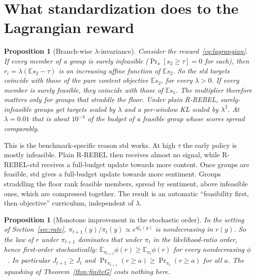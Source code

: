 \documentclass[11pt]{article}
\newtheorem{proposition}[theorem]{Proposition}
\theoremstyle{definition}
\theoremstyle{remark}
\newcommand{\E}{\mathbb{E}}
\newcommand{\1}{\mathbb{1}}
\newcommand{\rr}{R-REBEL}
\newcommand{\rrs}{R-REBEL-std}
\begin{document}
\section{What standardization does to the Lagrangian reward}\label{sec:lagrangian}

\begin{proposition}[Branch-wise $\lambda$-invariance]\label{prop:branch}
Consider the reward~\eqref{eq:lagrangian}. If every member of a group is surely
infeasible ($\Pr_o[s_2\ge\tau]=0$ for each), then $r_i=\lambda(\E s_2-\tau)$ is an
increasing affine function of $\E s_2$. So the std targets coincide with those of
the pure content objective $\E s_2$, for every $\lambda>0$. If every member is surely
feasible, they coincide with those of $\E s_1$. The multiplier therefore matters only
for groups that straddle the floor. Under plain \rr{}, surely-infeasible groups get
targets scaled by $\lambda$ and a per-window KL scaled by $\lambda^2$. At $\lambda=0.01$ that is
about $10^{-4}$ of the budget of a feasible group whose scores spread comparably.
\end{proposition}

This is the benchmark-specific reason std works. At high $\tau$ the early policy is
mostly infeasible. Plain \rr{} then receives almost no signal, while \rrs{} receives
a full-budget update towards more content. Once groups are feasible, std gives a
full-budget update towards more sentiment. Groups straddling the floor rank
feasible members, spread by sentiment, above infeasible ones, which are compressed
together. The result is an automatic ``feasibility first, then objective''
curriculum, independent of $\lambda$.

\begin{proposition}[Monotone improvement in the stochastic order]\label{prop:monotone}
In the setting of Section~\ref{sec:rate}, $\pi_{t+1}(y)/\pi_t(y)\propto e^{\eta\zeta_t(y)}$
is nondecreasing in $r(y)$. So the law of $r$ under $\pi_{t+1}$ dominates that under
$\pi_t$ in the likelihood-ratio order, hence first-order stochastically:
$\E_{\pi_{t+1}}\phi(r)\ge\E_{\pi_t}\phi(r)$ for every nondecreasing $\phi$~\cite{shaked}. In
particular $J_{t+1}\ge J_t$ and $\Pr_{\pi_{t+1}}(r\ge a)\ge\Pr_{\pi_t}(r\ge a)$ for all
$a$. The squashing of Theorem~\ref{thm:finiteG} costs nothing here.
\end{proposition}
\end{document}
